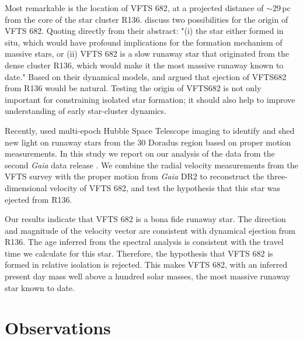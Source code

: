 \documentclass[apjl,twocolumn]{emulateapj}
\begin{document}
Most remarkable is the location of VFTS 682, at a projected distance of
$\sim$$29$\,pc from the core of the star cluster
R136. \citet{bestenlehner:11} discuss two possibilities for the
origin of VFTS 682. Quoting directly from their abstract: "(i) the
star either formed in situ, which would have profound implications for
the formation mechanism of massive stars, or (ii) VFTS 682 is a slow
runaway star that originated from the dense cluster R136, which would
make it the most massive runaway known to date." Based on their
dynamical models, \citet{fujii:11} and \citet{banerjee:12} argued that
ejection of VFTS682 from R136 would be natural. Testing the origin of
VFTS682 is not only important for constraining isolated star
formation; it should also help to improve understanding of early star-cluster dynamics.


Recently, \citet{platais:15,platais:18} used multi-epoch Hubble Space
Telescope imaging to identify and shed new light on runaway stars from
the 30 Doradus region based on proper motion measurements. In this study we report on our analysis of the data from the second \emph{Gaia} data release \cite[DR2,][]{gaia:16,brown:18}. We combine the radial velocity measurements from the VFTS survey \citep[][]{evans:11} with the proper motion from \emph{Gaia} DR2 to reconstruct the three-dimensional velocity of VFTS 682, and test the hypothesis that this star was ejected from R136. 

Our results indicate that VFTS 682 is a bona fide runaway star. The
direction and magnitude of the velocity vector are consistent with
dynamical ejection from R136. The age inferred from the spectral
analysis \citep[from][]{schneider:18} is consistent with the travel
time we calculate for this star. Therefore, the hypothesis that VFTS
682 is formed in relative isolation is rejected. This makes VFTS 682, with an inferred present day mass well above a hundred solar masses, the most massive runaway star known to date. 


\section{Observations}
\label{sec:sample}
\end{document}
